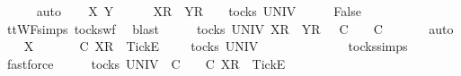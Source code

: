 \begin{isabellebody}
\ \ \ \ \isamarkupfalse%
\ auto\isanewline
{}\isamarkupfalse%
\isanewline
\ \ \isamarkupfalse%
\ X\ Y\ {\isasymrho}\ {\isasymsigma}\isanewline
\ \ \isamarkupfalse%
\ {\isachardoublequoteopen}{\isacharbrackleft}X{\isacharbrackright}\isactrlsub R\ {\isacharhash}\ {\isacharbrackleft}Y{\isacharbrackright}\isactrlsub R\ {\isacharhash}\ {\isasymrho}\ {\isasymin}\ tocks\ UNIV{\isachardoublequoteclose}\isanewline
\ \ \isamarkupfalse%
\ \isamarkupfalse%
\ {\isachardoublequoteopen}False{\isachardoublequoteclose}\isanewline
\ \ \ \ \isamarkupfalse%
\ ttWF{\isachardot}simps{\isacharparenleft}{}{}{\isacharparenright}\ tocks{\isacharunderscore}wf\ \isamarkupfalse%
\ blast\isanewline
\ \ \isamarkupfalse%
\ \isamarkupfalse%
\ {\isachardoublequoteopen}{\isasymexists}{\isasymrho}{\isacharprime}{\isasymin}tocks\ UNIV{\isachardot}\ {\isacharbrackleft}X{\isacharbrackright}\isactrlsub R\ {\isacharhash}\ {\isacharbrackleft}Y{\isacharbrackright}\isactrlsub R\ {\isacharhash}\ {\isasymrho}\ {\isasymlesssim}\isactrlsub C\ {\isasymrho}{\isacharprime}\ {\isasymand}\ {\isasymrho}{\isacharprime}\ {\isasymle}\isactrlsub C\ {\isasymsigma}{\isachardoublequoteclose}\isanewline
\ \ \ \ \isamarkupfalse%
\ auto\isanewline
{}\isamarkupfalse%
\isanewline
\ \ \isamarkupfalse%
\ X\ {\isasymrho}\ {\isasymsigma}\isanewline
\ \ \isamarkupfalse%
\ {\isachardoublequoteopen}{\isasymrho}\ {\isasymlesssim}\isactrlsub C\ {\isacharbrackleft}X{\isacharbrackright}\isactrlsub R\ {\isacharhash}\ {\isacharbrackleft}Tick{\isacharbrackright}\isactrlsub E\ {\isacharhash}\ {\isasymsigma}{\isachardoublequoteclose}\ {\isachardoublequoteopen}{\isasymrho}\ {\isasymin}\ tocks\ UNIV{\isachardoublequoteclose}\isanewline
\ \ \isamarkupfalse%
\ \isamarkupfalse%
\ {\isachardoublequoteopen}{\isasymrho}\ {\isacharequal}\ {\isacharbrackleft}{\isacharbrackright}{\isachardoublequoteclose}\isanewline
\ \ \ \ \isamarkupfalse%
\ tocks{\isachardot}simps\ \isamarkupfalse%
\ fastforce\isanewline
\ \ \isamarkupfalse%
\ \isamarkupfalse%
\ {\isachardoublequoteopen}{\isasymexists}{\isasymrho}{\isacharprime}{\isasymin}tocks\ UNIV{\isachardot}\ {\isasymrho}\ {\isasymlesssim}\isactrlsub C\ {\isasymrho}{\isacharprime}\ {\isasymand}\ {\isasymrho}{\isacharprime}\ {\isasymle}\isactrlsub C\ {\isacharbrackleft}X{\isacharbrackright}\isactrlsub R\ {\isacharhash}\ {\isacharbrackleft}Tick{\isacharbrackright}\isactrlsub E\ {\isacharhash}\ {\isasymsigma}{\isachardoublequoteclose}\isanewline

\end{isabellebody}
